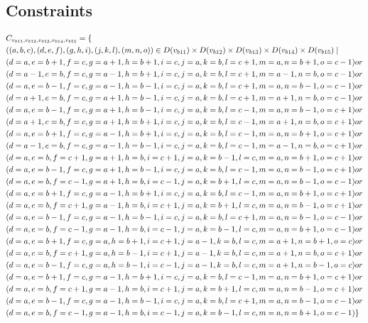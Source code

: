 \subsection{Constraints}
\begin{small}
\begin{align*}
&C_{v_{b11},v_{b12},v_{b13},v_{b14},v_{b15}}=\{\\
&((a,b,c),(d,e,f),(g,h,i),(j,k,l),(m,n,o))\in D(v_{b11}) \times D(v_{b12})\times D(v_{b13})\times D(v_{b14})\times D(v_{b15}) \mid\\
&(d=a , e=b+1,f=c , g=a+1,h=b+1,i=c ,j=a ,k=b ,l=c+1,m=a ,n=b+1,o=c-1)or\\
&(d=a-1,e=b , f=c,g=a-1,h=b+1,i=c ,j=a ,k=b ,l=c+1,m=a-1,n=b ,o=c-1)or\\
&(d=a , e=b-1,f=c , g=a-1,h=b-1,i=c ,j=a ,k=b ,l=c+1,m=a ,n=b-1,o=c-1)or\\
&(d=a+1,e=b , f=c , g=a+1,h=b-1,i=c ,j=a ,k=b ,l=c+1,m=a+1,n=b ,o=c-1)or\\
&(d=a , e=b-1, f=c , g=a+1,h=b-1,i=c ,j=a ,k=b ,l=c-1,m=a ,n=b-1,o=c+1)or\\
&(d=a+1,e=b , f=c , g=a+1,h=b+1,i=c ,j=a ,k=b ,l=c-1,m=a+1,n=b ,o=c+1)or\\
&(d=a , e=b+1, f=c , g=a-1,h=b+1,i=c ,j=a ,  k=b ,l=c-1,m=a ,n=b+1,o=c+1)or\\
&(d=a-1,e=b ,f=c , g=a-1,h=b-1,i=c ,j=a ,k=b ,l=c-1,m=a-1,n=b ,o=c+1)or\\
&(d=a ,e=b ,f=c+1, g=a+1,h=b ,i=c+1 ,j=a ,k=b-1,l=c ,m=a ,n=b+1,o=c+1)or\\
&(d=a ,e=b-1,f=c , g=a+1,h=b-1,i=c  ,j=a ,k=b ,l=c-1,m=a ,n=b-1,o=c+1)or\\
&(d=a ,e=b ,f=c-1, g=a+1,h=b ,i=c-1 ,j=a ,k=b+1,l=c ,m=a ,n=b-1,o=c-1)or\\
&(d=a ,e=b+1,f=c , g=a-1,h=b+1,i=c  ,j=a ,k=b ,l=c-1,m=a ,n=b+1,o=c+1)or\\
&(d=a ,e=b ,f=c+1, g=a-1,h=b ,i=c+1 ,j=a ,k=b+1,l=c ,m=a ,n=b-1,o=c+1)or\\
&(d=a ,e=b-1,f=c , g=a-1,h=b-1,i=c  ,j=a ,k=b ,l=c+1,m=a ,n=b-1,o=c-1)or\\
&(d=a ,e=b ,f=c-1, g=a-1,h=b ,i=c-1 ,j=a ,k=b-1,l=c ,m=a ,n=b+1,o=c-1)or\\
&(d=a ,e=b+1,f=c , g=a ,h=b+1,i=c+1 ,j=a-1,k=b ,l=c ,m=a+1,n=b+1,o=c )or\\
&(d=a ,e=b ,f=c+1, g=a ,h=b-1,i=c+1 ,j=a-1,k=b ,l=c ,m=a+1,n=b ,o=c+1)or\\
&(d=a ,e=b-1,f=c , g=a ,h=b-1,i=c-1 ,j=a-1,k=b ,l=c ,m=a+1,n=b-1,o=c )or\\
&(d=a ,e=b+1,f=c , g=a-1,h=b+1,i=c  ,j=a ,k=b ,l=c-1,m=a ,n=b+1,o=c+1)or\\
&(d=a ,e=b ,f=c+1, g=a-1,h=b ,i=c+1 ,j=a ,k=b+1,l=c ,m=a ,n=b-1,o=c+1)or\\
&(d=a ,e=b-1,f=c , g=a-1,h=b-1,i=c  ,j=a ,k=b ,l=c+1,m=a ,n=b-1,o=c-1)or\\
&(d=a ,e=b ,f=c-1, g=a-1,h=b ,i=c-1,j=a ,k=b-1,l=c ,m=a ,n=b+1,o=c-1)\}
\\
\end{align*}
\end{small}
